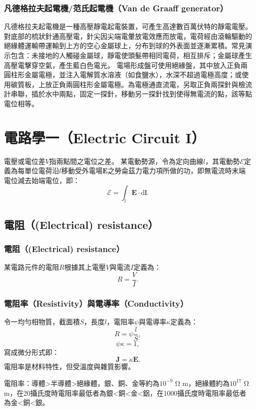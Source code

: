 \documentclass[a4paper,12pt]{report}
\begin{document}
\begin{itemize}
\subsubsection{凡德格拉夫起電機/范氏起電機（Van de Graaff generator）}
凡德格拉夫起電機是一種高壓靜電起電裝置，可產生高達數百萬伏特的靜電電壓。對底部的梳狀針通高壓電，針尖因尖端電暈放電效應而放電，電荷經由滾輪驅動的絕緣體運輸帶運輸到上方的空心金屬球上，分布到球的外表面並逐漸累積。常見演示包含：未接地的人觸碰金屬球，靜電使頭髮帶相同電荷，相互排斥；金屬球產生高壓電擊穿空氣，產生藍白色電光。
電場形成盤可使用絕緣盤，其中放入正負兩圓柱形金屬電極，並注入電解質水溶液（如食鹽水），水深不超過電極高度；或使用碳質板，上放正負兩圓柱形金屬電極。為電極通直流電，另取正負兩探針與檢流計串聯，插於水中兩點，固定一探針，移動另一探針找到使得無電流的點，該等點電位相等。


\section{電路學一（Electric Circuit I）}
電壓或電位差$V$指兩點間之電位之差。
某電動勢源，令為定向曲線$l$，其電動勢$\mathcal{E}$定義為每單位電荷沿$l$移動受外電場$\mathbf{E}$之勞侖茲力電力項所做的功，即無電流時末端電位減去始端電位，即：
\[\mathcal{E}=\int_{l}\mathbf{E}\cdot\mathrm{d}\mathbf{l}.\]
\subsection{電阻（(Electrical) resistance）}
\subsubsection{電阻（(Electrical) resistance）}
某電路元件的電阻$R$根據其上電壓$V$與電流$I$定義為：
\[R=\frac{V}{I}.\]
\subsubsection{電阻率（Resistivity）與電導率（Conductivity）}
令一均勻相物質，截面積$S$，長度$l$，電阻率$\psi$與電導率$\kappa$定義為：
\[R=\psi\frac{l}{S},\]
\[\psi\kappa=1,\]
寫成微分形式即：
\[\mathbf{J}=\kappa\mathbf{E}.\]
電阻率是材料特性，但受溫度與雜質影響。

電阻率：導體>半導體>絕緣體，銀、銅、金等約為$10^{-9}$ Ω m，絕緣體約為$10^{17}$ Ω m，在20攝氏度時電阻率最低者為銀<銅<金<鋁，在1000攝氏度時電阻率最低者為金<銅<銀。

\end{itemize}
\end{document}
